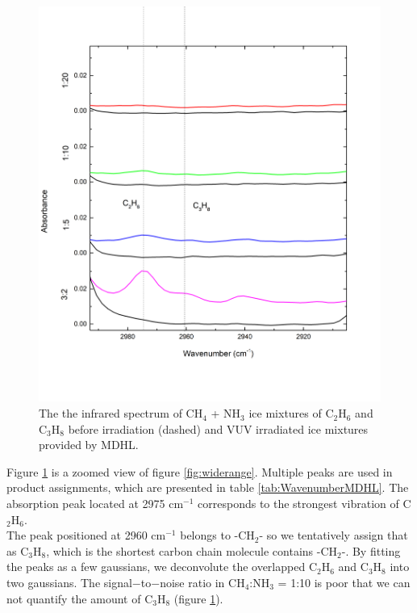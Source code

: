 \begin{figure}
\centering
\includegraphics[width=\textwidth]{figures/chapter3/C2H6.png}
\caption{The the infrared spectrum of CH$_4$ + NH$_3$ ice mixtures of C$_2$H$_6$ and C$_3$H$_8$ before irradiation (dashed) and VUV irradiated ice mixtures provided by MDHL. }
\label{fig:C2H6}
\end{figure}

Figure \ref{fig:C2H6} is a zoomed view of figure \ref{fig:widerange}. Multiple peaks are used in product assignments, which are presented in table \ref{tab:WavenumberMDHL}. The absorption peak located at 2975 cm$^{-1}$ corresponds to the strongest vibration of C$_2$H$_6$. \\

The peak positioned at 2960 cm$^{-1}$ belongs to -CH$_2$- so we tentatively assign that as C$_3$H$_8$, which is the shortest carbon chain molecule contains -CH$_2$-. By fitting the peaks as a few gaussians, we deconvolute the overlapped C$_2$H$_6$ and C$_3$H$_8$ into two gaussians. The signal$-$to$-$noise ratio in CH$_4$:NH$_3$ = 1:10 is poor that we can not quantify the amount of C$_3$H$_8$ (figure \ref{fig:C2H6}).\\

